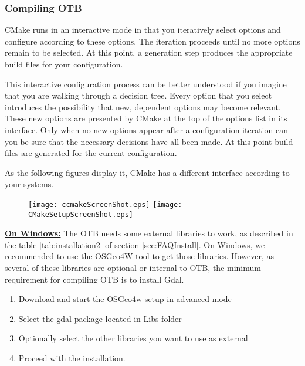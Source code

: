 \subsubsection{Compiling OTB}
CMake runs in an interactive mode in that you iteratively select
options and configure according to these options. The iteration
proceeds until no more options remain to be selected. At this point, a
generation step produces the appropriate build files for your
configuration.

This interactive configuration process can be better understood if you
imagine that you are walking through a decision tree.  Every option that you
select introduces the possibility that new, dependent options may become
relevant. These new options are presented by CMake at the top of the options
list in its interface.  Only when no new options appear after a configuration
iteration can you be sure that the necessary decisions have all been made. At
this point build files are generated for the current configuration.

As the following figures display it, CMake has a different interface according to your systems.
\label{sec:ConfiguringOTBwithVTK}

\begin{figure}[ht]
\centering
\texttt{[image: ccmakeScreenShot.eps]}
\texttt{[image: CMakeSetupScreenShot.eps]}
\label{fig:CMakeGUI}
\end{figure}


\textbf{\underline{On Windows:}}
The OTB needs some external libraries to work, as described in the table \ref{tab:installation2} of section \ref{sec:FAQInstall}. On Windows, we recommended to use the OSGeo4W tool to get those libraries. However, as several of these libraries are optional or internal to OTB, the minimum requirement for compiling OTB is to install Gdal.
\begin{enumerate}
\item Download and start the OSGeo4w setup in advanced mode
\item Select the gdal package located in Libs folder
\item Optionally select the other libraries you want to use as external
\item Proceed with the installation.
\end{enumerate}

